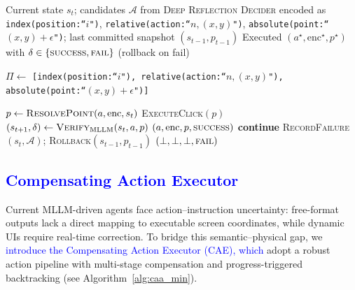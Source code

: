 \documentclass{article} %
\newcommand{\revise}[1]{\textcolor{blue}{#1}}
\begin{document}
\begin{algorithm}[t]
\caption{\revise{Compensating Action Executor (single step)}}%
\label{alg:caa_min}
\begin{algorithmic}[1]
\Require Current state $s_t$; candidates $\mathcal{A}$ from \textsc{Deep Reflection Decider} encoded as
\Statex \hspace{1.8em}\texttt{index(position:``$i$")}, \texttt{relative(action:``$n,(x,y)$")},
\Statex \hspace{1.8em}\texttt{absolute(point:``$(x,y)+\epsilon$")}; last committed snapshot $(s_{t-1}, p_{t-1})$
\Ensure Executed $(a^\star,\mathrm{enc}^\star,p^\star)$ with $\delta\in\{\textsc{success},\textsc{fail}\}$ (rollback on fail)

\State $\Pi \leftarrow$ \texttt{[index(position:``$i$"), relative(action:``$n,(x,y)$"),}
\Statex\hspace{1.8em}\texttt{absolute(point:``$(x,y)+\epsilon$")]} 

    \State $p \leftarrow \textsc{ResolvePoint}(a,\mathrm{enc},s_t)$ 
    \State \textsc{ExecuteClick}$(p)$
    \State $(s_{t+1},\delta) \leftarrow \textsc{Verify}_{\mathrm{MLLM}}(s_t,a,p)$
      \State \Return $(a,\mathrm{enc},p,\textsc{success})$ 
    \Else
      \State \textbf{continue} 
    \EndIf
  \EndIf
\EndFor
\State \textsc{RecordFailure}$(s_t,\mathcal{A})$; \textsc{Rollback}$(s_{t-1},p_{t-1})$
\State \Return $(\bot,\bot,\bot,\textsc{fail})$
\end{algorithmic}
\end{algorithm}

\subsection{{\revise{Compensating Action Executor}}}
\label{sec:Action_Actuator}


Current MLLM-driven agents face action–instruction uncertainty: free-format outputs lack a direct mapping to executable screen coordinates, while dynamic UIs require real-time correction. To bridge this semantic–physical gap, we \revise{introduce the Compensating Action Executor (CAE), which} adopt a robust action pipeline with multi-stage compensation and progress-triggered backtracking (see Algorithm~\ref{alg:caa_min}).
\end{document}
